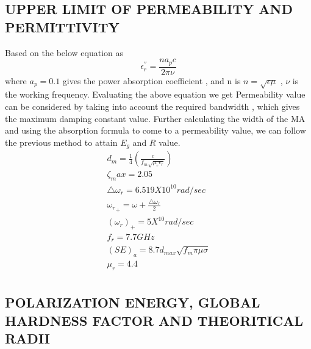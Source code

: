 \documentclass[journal]{IEEEtran}
\begin{document}
\subsection{UPPER LIMIT OF  PERMEABILITY AND PERMITTIVITY}
Based on the below equation as 
$$ \epsilon^{''}_r  = \dfrac{n a_p c}{2 \pi \nu}$$
where $a_p = 0.1$ gives the power absorption coefficient , and n is $n = \sqrt{\epsilon \mu}$ , $\nu$ is the 
working frequency. Evaluating the above equation we get
Permeability value can be considered by taking into account the required bandwidth , which gives the maximum damping constant value.
Further calculating the width of the MA and using the absorption formula to come to a permeability value, we can follow the previous method to attain $E_g$ and $R $ value.
\begin{align}
d_m = \frac{1}{4}(\frac{c}{f_m \sqrt{\mu_r \epsilon_r}})   \\
\zeta_max= 2.05                                              \\
\triangle \omega_r = 6.519X 10^{10} rad/sec                   \\
{\omega_r}_+ = \omega + \frac{\triangle \omega_r}{2}            \\     
(\omega_r)_+ = 5 X ^{10} rad/sec                               \\
f_r = 7.7 GHz                                                 \\
(SE)_a = 8.7 d_{max} \sqrt{f_m \pi \mu \sigma}                  \\
\mu_r = 4.4                                                   \\
\end{align}



\subsection{POLARIZATION ENERGY, GLOBAL HARDNESS FACTOR AND THEORITICAL RADII}

\end{document}
